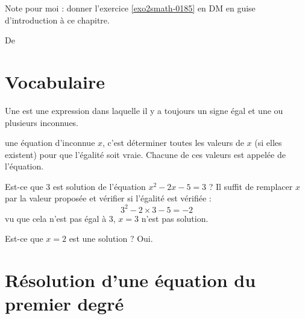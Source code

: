 
Note pour moi : donner l'exercice \ref{exo2smath-0185} en DM en guise d'introduction à ce chapitre.


De \cite{NRHooXFvgpp4}

\section{Vocabulaire}

\begin{definition}
    Une  est une expression dans laquelle il y a toujours un signe égal et une ou plusieurs inconnues.
\end{definition}

\begin{definition}
     une équation d'inconnue \( x\), c'est déterminer toutes les valeurs de \( x\) (si elles existent) pour que l'égalité soit vraie. Chacune de ces valeurs est appelée  de l'équation.
\end{definition}

\begin{example}
    Est-ce que \( 3\) est solution de l'équation \(  x^2-2x-5=3  \) ? Il suffit de remplacer \( x\) par la valeur proposée et vérifier si l'égalité est vérifiée :
    \begin{equation}
        3^2-2\times 3-5=-2
    \end{equation}
    vu que cela n'est pas égal à \( 3\), \( x=3\) n'est pas solution.

    Est-ce que \( x=2\) est une solution ? Oui.
\end{example}

\section{Résolution d'une équation du premier degré}

